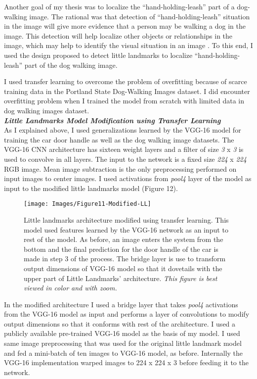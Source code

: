 \documentclass [11pt,letterpaper ,twoside ,openany ]{report}
\begin{document}
    Another goal of my thesis was to localize the ``hand-holding-leash'' part of a dog-walking image. The rational was that detection of ``hand-holding-leash'' situation in the image will give more evidence that a person may be walking a dog in the image. This detection will help localize other objects or relationships in the image, which may help to identify the visual situation in an image \cite{quinn2018semantic}. To this end, I used the design proposed to detect little landmarks \cite{Singh_2016_CVPR} to localize ``hand-holding-leash'' part of the dog walking image. 

    I used transfer learning to overcome the problem of overfitting because of scarce training data in the Portland State Dog-Walking Images dataset. I did encounter overfitting problem when I trained the model from scratch with limited data in dog walking images dataset. \\

    \noindent
    \textbf{\textit{Little Landmarks Model Modification using Transfer Learning}}\\                   
    As I explained above, I used generalizations learned by the VGG-16 model for training the car door handle as well as the dog walking image datasets.  The VGG-16 CNN architecture has sixteen weight layers and a filter of size \textit{3} x \textit{3} is used to convolve in all layers. The input to the network is a fixed size \textit{224} x \textit{224} RGB image. Mean image subtraction is the only preprocessing performed on input images to center images. I used activations from \textit{pool4} layer of the model as input to the modified little landmarks model (Figure 12).     

    \begin{figure}[h]
      \centering
      \texttt{[image: Images/Figure11-Modified-LL]}
      \caption{Little landmarks architecture modified using transfer learning. This model used features learned by the VGG-16 network as an input to rest of the model. As before, an image enters the system from the bottom and the final prediction for the door handle of the car is made in step 3 of the process. The bridge layer is use to transform output dimensions of VGG-16 model so that it dovetails with the upper part of Little Landmarks' architecture. \textit{This figure is best viewed in color and with zoom.}}
      \label{fig:tl_arch}
    \end{figure}        

    In the modified architecture I used a bridge layer that takes \textit{pool4} activations from the VGG-16 model as input and performs a layer of convolutions to modify output dimensions so that it conforms with rest of the architecture. I used a publicly available pre-trained VGG-16 model \cite{machrisaa2017} as the basis of my model. I used same image preprocessing that was used for the original little landmark model and fed a mini-batch of ten images to VGG-16 model, as before. Internally the VGG-16 implementation warped images to 224 x 224 x 3 before feeding it to the network.    
\end{document}
